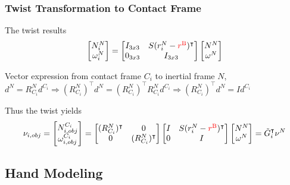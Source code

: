 \documentclass{beamer}
\begin{document}

\begin{frame}
\frametitle{Twist Transformation to Contact Frame}
The twist results
\begin{equation*}
\begin{bmatrix}
N_{i}^{N}\\
\omega_{i}^{N}
\end{bmatrix}=
\begin{bmatrix}
I_{3x3} & S(r_{i}^{N}-{\color{red}r^{\textrm{B}}})^{\intercal}\\
0_{3x3} & I_{3x3} 
\end{bmatrix}
\begin{bmatrix}
N^N\\
\omega^{N}
\end{bmatrix}
\end{equation*}

Vector expression from contact frame ${C_i}$ to inertial frame ${N}$, $d^{N}=R_{C_i}^{N}d^{C_i}\Rightarrow (R_{C_i}^{N})^{\intercal}d^{N}=(R_{C_i}^{N})^{\intercal}R_{C_i}^{N}d^{C_i}\Rightarrow (R_{C_i}^{N})^{\intercal}d^{N}=Id^{C_i} $ \vspace{.2cm}

Thus the twist yields
\begin{equation*}
\nu_{i,obj}=
\begin{bmatrix}
N_{i,obj}^{C_i}\\
\omega_{i,obj}^{C_i}
\end{bmatrix}=
\begin{bmatrix}
(R_{C_i}^{N})^{\intercal} & 0\\
0 &(R_{C_i}^{N})^{\intercal} 
\end{bmatrix}
\begin{bmatrix}
I & S(r_{i}^{N}-{\color{red}r^{\textrm{B}}})^{\intercal}\\
0 & I
\end{bmatrix}
\begin{bmatrix}
N^N\\
\omega^{N}
\end{bmatrix}=\tilde{G}^{\intercal}_i \nu^N
\end{equation*}
\end{frame}

\subsection{Hand Modeling}
\end{document}
